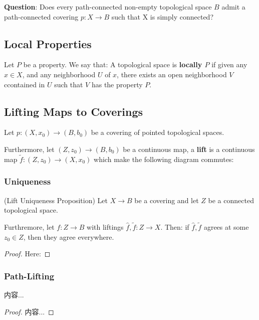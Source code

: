 \documentclass[Total.tex]{subfiles}
\begin{document}
			\textbf{Question}: Does every path-connected non-empty topological space $B$ admit a
			path-connected covering $p:X\rightarrow B$ such that X is simply connected?
			\subsection{Local Properties}
				\begin{Def}
					Let $P$ be a property. We say that: A topological space is \textbf{locally $P$} if given any $x\in X$, and any neighborhood $U$ of $x$, there exists an open neighborhood $V$ ccontained in $U$ such that $V$ has the property $P$.
				\end{Def}
			\subsection{Lifting Maps to Coverings}
				\begin{Def}
					Let $p:(X,x_0)\rightarrow (B,b_0)$ be a covering of pointed topological spaces.
					
					Furthermore, let $(Z,z_0)\rightarrow (B,b_0)$ be a continuous map, a \textbf{lift} is a continuous map $\tilde{f}:(Z,z_0)\rightarrow (X,x_0)$ which make the following diagram commutes:
					\begin{center}
					\end{center}
				\end{Def}
				\subsubsection{Uniqueness}
				\begin{proposition}
					(Lift Uniqueness Proposition) Let $X\rightarrow B$ be a covering and let $Z$ be a connected topological space.
					
					Furthremore, let $f:Z\rightarrow B$ with liftings $\hat{f},\tilde{f}:Z\rightarrow X$. Then: if $\hat{f},\tilde{f}$ agrees at some $z_0\in Z$, then they agree everywhere.
				\end{proposition}
				\begin{proof}
					Here: 
				\end{proof}
				\subsubsection{Path-Lifting}
				\begin{proposition}
					内容...
				\end{proposition}
				\begin{proof}
					内容...
				\end{proof}
\end{document}
